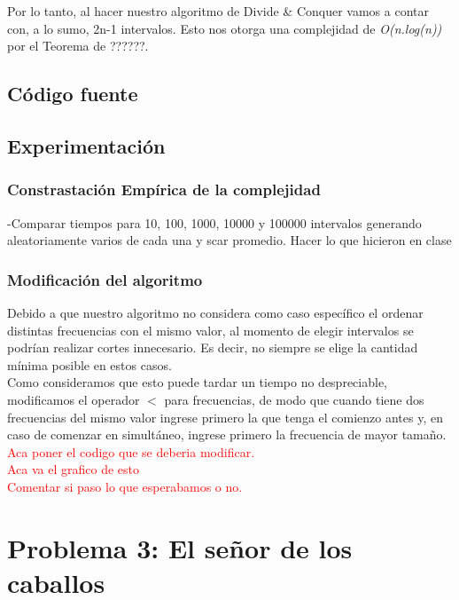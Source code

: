 \documentclass[a4paper]{article}
\begin{document}
Por lo tanto, al hacer nuestro algoritmo de Divide \& Conquer vamos a contar con, a lo sumo, 2n-1 intervalos. Esto nos otorga una complejidad de \emph{O(n.log(n))} por el Teorema de ??????.

\newpage
\subsection{C\'odigo fuente}
\newpage
\subsection{Experimentaci\'on}

\subsubsection{Constrastaci\'on Emp\'irica de la complejidad}
-Comparar tiempos para 10, 100, 1000, 10000 y 100000 intervalos generando aleatoriamente varios de cada una y scar promedio. Hacer lo que hicieron en clase\\


\newpage
\subsubsection{Modificaci\'on del algoritmo}
Debido a que nuestro algoritmo no considera como caso espec\'ifico el ordenar distintas frecuencias con el mismo valor, al momento de elegir intervalos se podr\'ian realizar cortes innecesario. Es decir, no siempre se elige la cantidad m\'inima posible en estos casos.\\

Como consideramos que esto puede tardar un tiempo no despreciable, modificamos el operador $<$ para frecuencias, de modo que cuando tiene dos frecuencias del mismo valor ingrese primero la que tenga el comienzo antes y, en caso de comenzar en simult\'aneo, ingrese primero la frecuencia de mayor tama\~no.\\

\textcolor{red}{Aca poner el codigo que se deberia modificar.}\\

\textcolor{red}{Aca va el grafico de esto}\\

\textcolor{red}{Comentar si paso lo que esperabamos o no.}


\newpage



\section{Problema 3: El se\~nor de los caballos}
\end{document}
